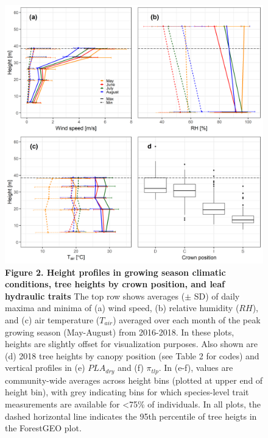 \documentclass[
]{article}
\begin{document}
\begin{figure}
\centering
\includegraphics[width=5.20833in,height=\textheight]{tables_figures/Figure2.png}
\caption{\textbf{Figure 2. Height profiles in growing season climatic
conditions, tree heights by crown position, and leaf hydraulic traits}
The top row shows averages (\(\pm\) SD) of daily maxima and minima of
(a) wind speed, (b) relative humidity (\(RH\)), and (c) air temperature
(\(T_{air}\)) averaged over each month of the peak growing season
(May-August) from 2016-2018. In these plots, heights are slightly offset
for visualization purposes. Also shown are (d) 2018 tree heights by
canopy position (see Table 2 for codes) and vertical profiles in (e)
\(PLA_{dry}\) and (f) \(\pi_{tlp}\). In (e-f), values are community-wide
averages across height bins (plotted at upper end of height bin), with
grey indicating bins for which species-level trait measurements are
available for \textless75\% of individuals. In all plots, the dashed
horizontal line indicates the 95th percentile of tree heigts in the
ForestGEO plot.}
\end{figure}

  
\end{document}
